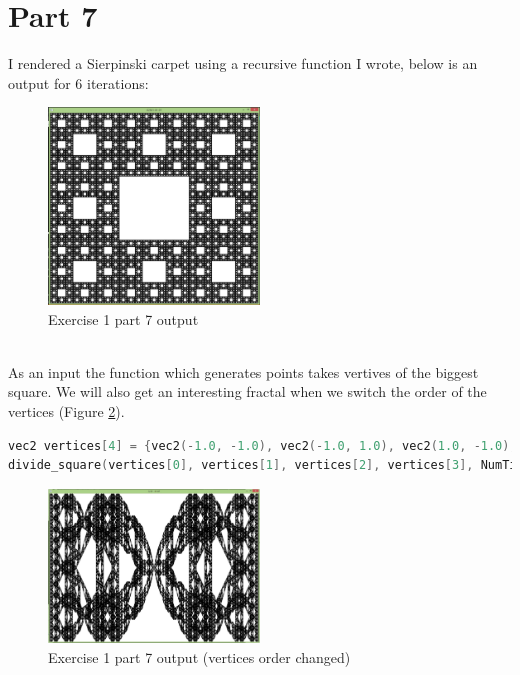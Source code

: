 \section{Part 7}
I rendered a Sierpinski carpet using a recursive function I wrote, below is an output for 6 iterations:
\begin{figure}[ht!]
	\begin{center}
		\includegraphics[width=0.5\textwidth]{figures/exercise_1_part_7}
	\end{center}
	\vspace{-4.5ex}\caption{Exercise 1 part 7 output}
	\label{fig:exercise_1_part_7} 
\end{figure} \\
As an input the function which generates points takes vertives of the biggest square. We will also get
an interesting fractal when we switch the order of the vertices (Figure \ref{fig:exercise_1_part_7_extra}).
\begin{lstlisting}[language=cpp, caption={Exercise 1 part 7 point gen.}]
vec2 vertices[4] = {vec2(-1.0, -1.0), vec2(-1.0, 1.0), vec2(1.0, -1.0), vec2(1.0, 1.0)};
divide_square(vertices[0], vertices[1], vertices[2], vertices[3], NumTimesToSubdivide);
\end{lstlisting}
\begin{figure}[ht!]
	\begin{center}
		\includegraphics[width=0.5\textwidth]{figures/exercise_1_part_7_extra}
	\end{center}
	\vspace{-4.5ex}\caption{Exercise 1 part 7 output (vertices order changed)}
	\label{fig:exercise_1_part_7_extra} 
\end{figure}